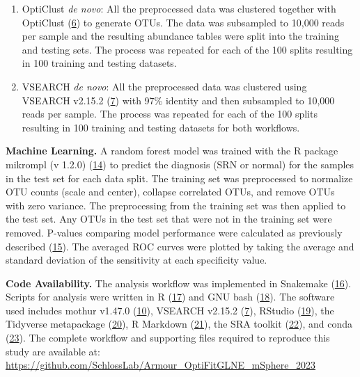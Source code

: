 \documentclass[
]{article}
\providecommand{\tightlist}{%
  \setlength{\itemsep}{0pt}\setlength{\parskip}{0pt}}
\begin{document}
\begin{enumerate}
\def\labelenumi{\arabic{enumi}.}
\setcounter{enumi}{3}
\tightlist
\item
  OptiClust \emph{de novo}: All the preprocessed data was clustered
  together with OptiClust (\protect\hyperlink{ref-westcott2017}{6}) to
  generate OTUs. The data was subsampled to 10,000 reads per sample and
  the resulting abundance tables were split into the training and
  testing sets. The process was repeated for each of the 100 splits
  resulting in 100 training and testing datasets.
\item
  VSEARCH \emph{de novo}: All the preprocessed data was clustered using
  VSEARCH v2.15.2 (\protect\hyperlink{ref-rognes2016}{7}) with 97\%
  identity and then subsampled to 10,000 reads per sample. The process
  was repeated for each of the 100 splits resulting in 100 training and
  testing datasets for both workflows.
\end{enumerate}

\textbf{Machine Learning.} A random forest model was trained with the R
package mikrompl (v 1.2.0)
(\protect\hyperlink{ref-topuxe7uoglu2021}{14}) to predict the diagnosis
(SRN or normal) for the samples in the test set for each data split. The
training set was preprocessed to normalize OTU counts (scale and
center), collapse correlated OTUs, and remove OTUs with zero variance.
The preprocessing from the training set was then applied to the test
set. Any OTUs in the test set that were not in the training set were
removed. P-values comparing model performance were calculated as
previously described (\protect\hyperlink{ref-topuxe7uoglu2020}{15}). The
averaged ROC curves were plotted by taking the average and standard
deviation of the sensitivity at each specificity value.

\textbf{Code Availability.} The analysis workflow was implemented in
Snakemake (\protect\hyperlink{ref-koster2012}{16}). Scripts for analysis
were written in R (\protect\hyperlink{ref-R2020}{17}) and GNU bash
(\protect\hyperlink{ref-GNUbash}{18}). The software used includes mothur
v1.47.0 (\protect\hyperlink{ref-schloss2009}{10}), VSEARCH v2.15.2
(\protect\hyperlink{ref-rognes2016}{7}), RStudio
(\protect\hyperlink{ref-RStudio2019}{19}), the Tidyverse metapackage
(\protect\hyperlink{ref-wickham2019}{20}), R Markdown
(\protect\hyperlink{ref-xie_r_2018}{21}), the SRA toolkit
(\protect\hyperlink{ref-noauthor_sra-tools_nodate}{22}), and conda
(\protect\hyperlink{ref-noauthor_anaconda_2016}{23}). The complete
workflow and supporting files required to reproduce this study are
available at:
\url{https://github.com/SchlossLab/Armour_OptiFitGLNE_mSphere_2023}
\end{document}
